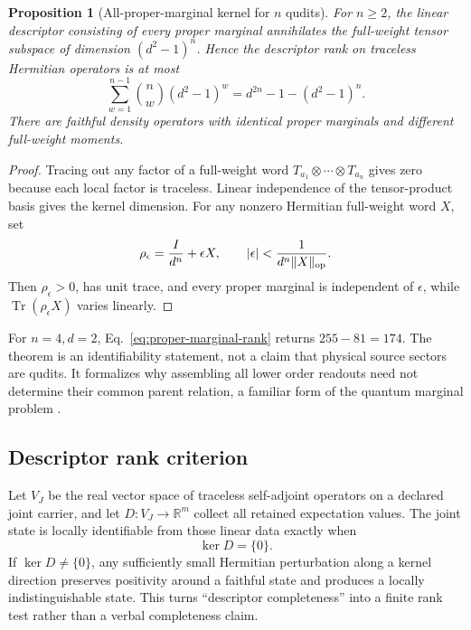 \documentclass[11pt]{article}
\newtheorem{proposition}{Proposition}
\newcommand{\Tr}{\operatorname{Tr}}
\begin{document}
\begin{proposition}[All-proper-marginal kernel for \(n\) qudits]
For \(n\ge2\), the linear descriptor consisting of every proper marginal
annihilates the full-weight tensor subspace of dimension
\((d^2-1)^n\).  Hence the descriptor rank on traceless Hermitian operators is
at most
\begin{equation}
 \sum_{w=1}^{n-1}{n\choose w}(d^2-1)^w
 =d^{2n}-1-(d^2-1)^n.
 \label{eq:proper-marginal-rank}
\end{equation}
There are faithful density operators with identical proper marginals and
different full-weight moments.
\end{proposition}
\begin{proof}
Tracing out any factor of a full-weight word
\(T_{a_1}\otimes\cdots\otimes T_{a_n}\) gives zero because each local factor
is traceless.  Linear independence of the tensor-product basis gives the
kernel dimension.  For any nonzero Hermitian full-weight word \(X\), set
\begin{equation}
 \rho_\epsilon={I\over d^n}+\epsilon X,
 \qquad
 |\epsilon|<{1\over d^n\lVert X\rVert_{\rm op}}.
 \label{eq:general-marginal-family}
\end{equation}
Then \(\rho_\epsilon>0\), has unit trace, and every proper marginal is
independent of \(\epsilon\), while \(\Tr(\rho_\epsilon X)\) varies linearly.
\end{proof}

For \(n=4,d=2\), Eq.~\eqref{eq:proper-marginal-rank} returns
\(255-81=174\).  The theorem is an identifiability statement, not a claim that
physical source sectors are qudits.  It formalizes why assembling all lower
order readouts need not determine their common parent relation, a familiar
form of the quantum marginal problem \cite{Klyachko2006,Bravyi2004,
LindenPopescuWootters2002}.

\subsection{Descriptor rank criterion}

Let \(V_J\) be the real vector space of traceless self-adjoint operators on a
declared joint carrier, and let
\(D:V_J\to\mathbb R^m\) collect all retained expectation values.  The joint
state is locally identifiable from those linear data exactly when
\begin{equation}
 \ker D=\{0\}.
 \label{eq:descriptor-rank}
\end{equation}
If \(\ker D\ne\{0\}\), any sufficiently small Hermitian perturbation along a
kernel direction preserves positivity around a faithful state and produces a
locally indistinguishable state.  This turns ``descriptor completeness'' into
a finite rank test rather than a verbal completeness claim.
\end{document}
